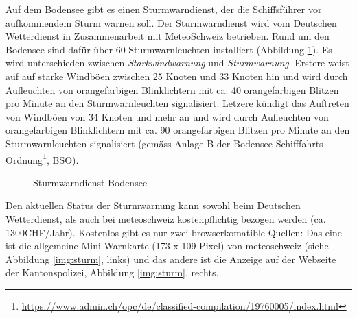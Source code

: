Auf dem Bodensee gibt es einen Sturmwarndienst, der die Schiffsführer vor aufkommendem Sturm warnen soll. Der Sturmwarndienst wird vom Deutschen Wetterdienst in Zusammenarbeit mit MeteoSchweiz betrieben. Rund um den Bodensee sind dafür über 60 Sturmwarnleuchten installiert (Abbildung \ref{img:sturm2}). Es wird unterschieden zwischen \textit{Starkwindwarnung} und \textit{Sturmwarnung}. Erstere weist auf auf starke Windböen zwischen 25 Knoten und 33 Knoten hin und wird durch Aufleuchten von orangefarbigen Blinklichtern mit ca. 40 orangefarbigen Blitzen pro Minute an den Sturmwarnleuchten signalisiert. Letzere kündigt das Auftreten von Windböen von 34 Knoten und mehr an und wird durch Aufleuchten von orangefarbigen Blinklichtern mit ca. 90 orangefarbigen Blitzen pro Minute an den Sturmwarnleuchten signalisiert (gemäss Anlage B der Bodensee-Schifffahrts-Ordnung\footnote{ \url{https://www.admin.ch/opc/de/classified-compilation/19760005/index.html}}, BSO).

\begin{figure}[h!]
	\centering
	\caption{Sturmwarndienst Bodensee}
	\label{img:sturm2}
\end{figure}

Den aktuellen Status der Sturmwarnung kann sowohl beim Deutschen Wetterdienst, als auch bei meteoschweiz kostenpflichtig bezogen werden (ca. 1300CHF/Jahr). Kostenlos gibt es nur zwei browserkomatible Quellen: Das eine ist die allgemeine Mini-Warnkarte (173 x 109 Pixel) von meteoschweiz (siehe Abbildung \ref{img:sturm}, links) und das andere ist die Anzeige auf der Webseite der Kantonspolizei, Abbildung \ref{img:sturm}, rechts.

